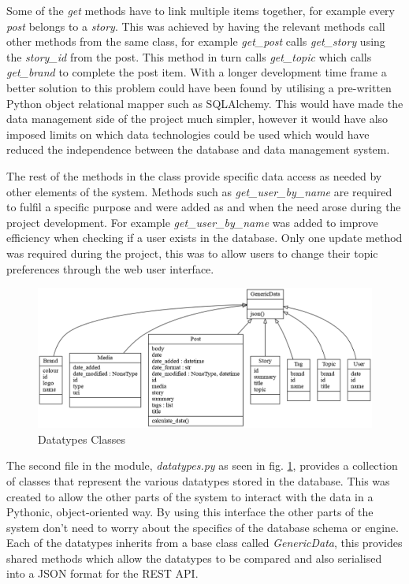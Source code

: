 \documentclass[12pt,titlepage]{article}
\begin{document}
  Some of the \textit{get} methods have to link multiple items together, for
  example every \textit{post} belongs to a \textit{story}. This was achieved by
  having the relevant methods call other methods from the same class, for
  example \textit{get\_post} calls \textit{get\_story} using the \textit{story\_id}
  from the post. This method in turn calls \textit{get\_topic} which calls
  \textit{get\_brand} to complete the post item. With a longer development
  time frame a better solution to this problem could have been found by utilising
  a pre-written Python object relational mapper such as SQLAlchemy. This would
  have made the data management side of the project much simpler, however it
  would have also imposed limits on which data technologies could be used which
  would have reduced the independence between the database and data management
  system.

  The rest of the methods in the class provide specific data access as needed by
  other elements of the system. Methods such as \textit{get\_user\_by\_name} are
  required to fulfil a specific purpose and were added as and when the need
  arose during the project development. For example \textit{get\_user\_by\_name}
  was added to improve efficiency when checking if a user exists in the
  database. Only one update method was required during the project, this was to
  allow users to change their topic preferences through the web user interface.

  \begin{figure}
    \centering
    \includegraphics[width=\textwidth]{../img/datatypes.png}
    \caption{Datatypes Classes}
    \label{fig:datatypes}
  \end{figure}

  The second file in the module, \textit{datatypes.py} as seen in fig.
  \ref{fig:datatypes}, provides a collection of classes that represent the
  various datatypes stored in the database. This was created to allow the other
  parts of the system to interact with the data in a Pythonic, object-oriented
  way. By using this interface the other parts of the system don't need to worry
  about the specifics of the database schema or engine. Each of the datatypes
  inherits from a base class called \textit{GenericData}, this provides shared
  methods which allow the datatypes to be compared and also serialised into a
  JSON format for the REST API.
\end{document}
